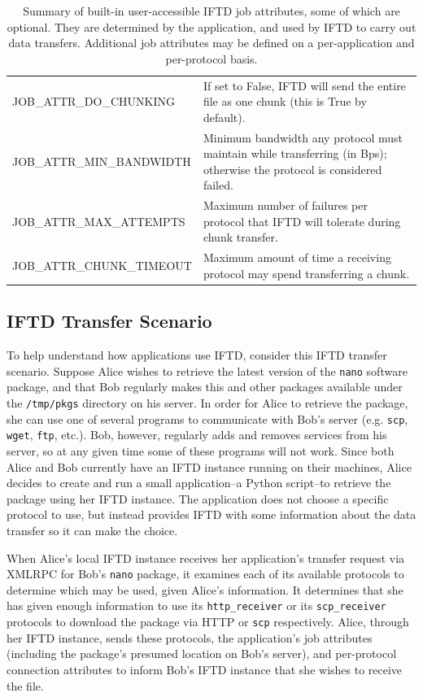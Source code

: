 \begin{table}[ht!]
\begin{tabular}{ | l | p{10cm} |}
JOB\_ATTR\_DO\_CHUNKING & If set to False, IFTD will send the entire file as one chunk (this is True by default). \\
JOB\_ATTR\_MIN\_BANDWIDTH & Minimum bandwidth any protocol must maintain while transferring (in Bps); otherwise the protocol is considered failed. \\
JOB\_ATTR\_MAX\_ATTEMPTS & Maximum number of failures per protocol that IFTD will tolerate during chunk transfer. \\
JOB\_ATTR\_CHUNK\_TIMEOUT & Maximum amount of time a receiving protocol may spend transferring a chunk. \\
\hline
\end{tabular}
\caption{Summary of built-in user-accessible IFTD job attributes, some of which are optional.  They are determined by the application, and used by IFTD to carry out data transfers.  Additional job attributes may be defined on a per-application and per-protocol basis.}
\end{table}

\subsection{IFTD Transfer Scenario}

To help understand how applications use IFTD, consider this IFTD transfer scenario.  Suppose Alice wishes to retrieve the latest version of the \texttt{nano} software package, and that Bob regularly makes this and other packages available under the \texttt{/tmp/pkgs} directory on his server.  In order for Alice to retrieve the package, she can use one of several programs to communicate with Bob's server (e.g. \texttt{scp}, \texttt{wget}, \texttt{ftp}, etc.).  Bob, however, regularly adds and removes services from his server, so at any given time some of these programs will not work.  Since both Alice and Bob currently have an IFTD instance running on their machines, Alice decides to create and run a small application--a Python script--to retrieve the package using her IFTD instance.  The application does not choose a specific protocol to use, but instead provides IFTD with some information about the data transfer so it can make the choice.

When Alice's local IFTD instance receives her application's transfer request via XMLRPC \cite{xmlrpc_book} for Bob's \texttt{nano} package, it examines each of its available protocols to determine which may be used, given Alice's information.  It determines that she has given enough information to use its \texttt{http\_receiver} or its \texttt{scp\_receiver} protocols to download the package via HTTP or \texttt{scp} respectively.  Alice, through her IFTD instance, sends these protocols, the application's job attributes (including the package's presumed location on Bob's server), and per-protocol connection attributes to inform Bob's IFTD instance that she wishes to receive the file.

